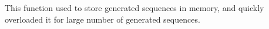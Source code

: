 
\begin{DoxyRefList}
\item[\label{deprecated__deprecated000001}%
\Hypertarget{deprecated__deprecated000001}%
Member \hyperlink{classGenModel_a72c20c4c6d81b5c464bffad5acd36286}{Gen\+Model\+:\+:generate\+\_\+sequences} (int, bool)]This function used to store generated sequences in memory, and quickly overloaded it for large number of generated sequences. 
\end{DoxyRefList}